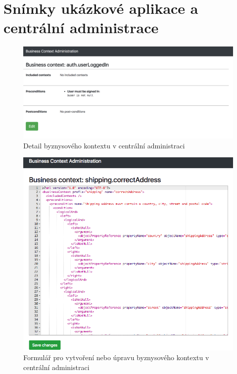 
\chapter{Snímky ukázkové aplikace a centrální administrace}

\begin{figure}[H]
    \centering
    \includegraphics[width=0.9\linewidth]{figures/business-context-detail.png}
    \caption{Detail byznysového kontextu v centrální administraci}
    \label{fig:screenshot-context-detail}
\end{figure}

\begin{figure}[H]
    \centering
    \includegraphics[width=0.9\linewidth]{figures/business-context-edit.png}
    \caption{Formulář pro vytvoření nebo úpravu byznysového kontextu v centrální administraci}
    \label{fig:screenshot-context-edit}
\end{figure}
